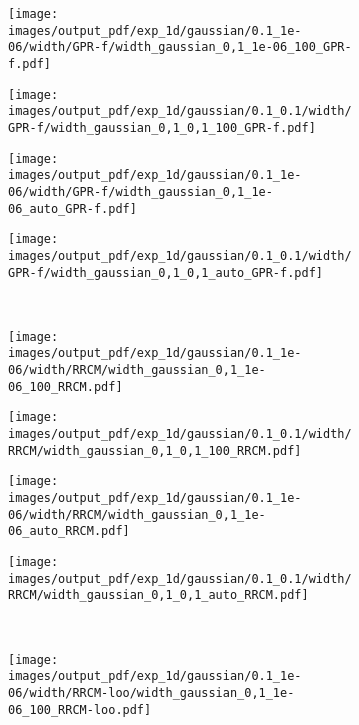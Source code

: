 \documentclass[a4paper,14pt]{extarticle}
\begin{document}
\begin{figure}%
  \centering
  \begin{subfigure}[b]{0.25\linewidth}
    \texttt{[image: images/output\_pdf/exp\_1d/gaussian/0.1\_1e-06/width/GPR-f/width\_gaussian\_0,1\_1e-06\_100\_GPR-f.pdf]}
  \end{subfigure}%
  \begin{subfigure}[b]{0.25\linewidth}
    \texttt{[image: images/output\_pdf/exp\_1d/gaussian/0.1\_0.1/width/GPR-f/width\_gaussian\_0,1\_0,1\_100\_GPR-f.pdf]}
  \end{subfigure}%
  \begin{subfigure}[b]{0.25\linewidth}
    \texttt{[image: images/output\_pdf/exp\_1d/gaussian/0.1\_1e-06/width/GPR-f/width\_gaussian\_0,1\_1e-06\_auto\_GPR-f.pdf]}
  \end{subfigure}%
  \begin{subfigure}[b]{0.25\linewidth}
    \texttt{[image: images/output\_pdf/exp\_1d/gaussian/0.1\_0.1/width/GPR-f/width\_gaussian\_0,1\_0,1\_auto\_GPR-f.pdf]}
  \end{subfigure}\\
  \begin{subfigure}[b]{0.25\linewidth}
    \texttt{[image: images/output\_pdf/exp\_1d/gaussian/0.1\_1e-06/width/RRCM/width\_gaussian\_0,1\_1e-06\_100\_RRCM.pdf]}
  \end{subfigure}%
  \begin{subfigure}[b]{0.25\linewidth}
    \texttt{[image: images/output\_pdf/exp\_1d/gaussian/0.1\_0.1/width/RRCM/width\_gaussian\_0,1\_0,1\_100\_RRCM.pdf]}
  \end{subfigure}%
  \begin{subfigure}[b]{0.25\linewidth}
    \texttt{[image: images/output\_pdf/exp\_1d/gaussian/0.1\_1e-06/width/RRCM/width\_gaussian\_0,1\_1e-06\_auto\_RRCM.pdf]}
  \end{subfigure}%
  \begin{subfigure}[b]{0.25\linewidth}
    \texttt{[image: images/output\_pdf/exp\_1d/gaussian/0.1\_0.1/width/RRCM/width\_gaussian\_0,1\_0,1\_auto\_RRCM.pdf]}
  \end{subfigure}\\
  \begin{subfigure}[b]{0.25\linewidth}
    \texttt{[image: images/output\_pdf/exp\_1d/gaussian/0.1\_1e-06/width/RRCM-loo/width\_gaussian\_0,1\_1e-06\_100\_RRCM-loo.pdf]}
  \end{subfigure}%

\end{figure}
\end{document}
